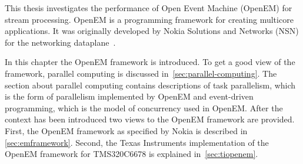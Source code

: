 This thesis investigates the performance of Open Event Machine (OpenEM) for stream processing. OpenEM is a programming framework for creating multicore applications. It was originally developed by Nokia Solutions and Networks (NSN) for the networking dataplane~\cite{openemintro}. 

In this chapter the OpenEM framework is introduced. To get a good view of the framework, parallel computing is discussed in~\ref{sec:parallel-computing}. The section about parallel computing contains descriptions of task parallelism, which is the form of parallelism implemented by OpenEM and event-driven programming, which is the model of concurrency used in OpenEM. After the context has been introduced two views to the OpenEM framework are provided. First, the OpenEM framework as specified by Nokia is described in \ref{sec:emframework}. Second, the Texas Instruments implementation of the OpenEM framework for TMS320C6678 is explained in~\ref{sec:tiopenem}.
